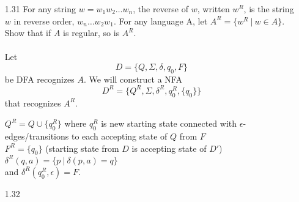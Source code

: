 \begin{enumerate}

\item [1.31]
For any string $w = w_1w_2\ldots w_n$, the reverse of $w$, written $w^R$, is the string $w$ in reverse order, $w_n \ldots w_2w_1$. For any language A, let $A^R = \{w^R ~|~ w \in A\}$. Show that if $A$ is regular, so is $A^R$.
\\
\\
Let $$D = \{Q, \Sigma, \delta, q_0, F\}$$ be DFA recognizes $A$. We will construct a NFA $$D^R = \{Q^R, \Sigma, \delta^R, q^R_0, \{q_0\}\}$$ that recognizes $A^R$.

$Q^R = Q \cup \{q^R_0\}$ where $q^R_0$ is new starting state connected with $\epsilon$-edges/transitions to each accepting state of $Q$ from $F$  \\
$F^R = \{q_0\}$ (starting state from $D$ is accepting state of $D'$) \\
$\delta^R(q, a) = \{p ~|~ \delta(p, a) = q\}$ \\
and $\delta^R(q^R_0, \epsilon) = F$.





\item [1.32]


\end{enumerate}
